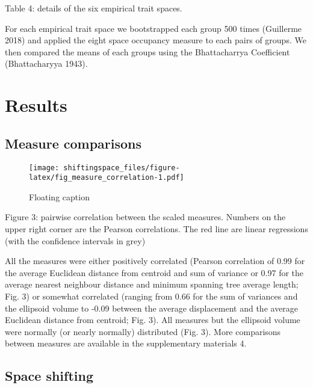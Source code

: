 \documentclass[]{article}
\begin{document}
Table 4: details of the six empirical trait spaces.

For each empirical trait space we bootstrapped each group 500 times
(Guillerme 2018) and applied the eight space occupancy measure to each
pairs of groups. We then compared the means of each groups using the
Bhattacharrya Coefficient (Bhattacharyya 1943).

\section{Results}\label{results}

\subsection{Measure comparisons}\label{measure-comparisons-1}

\begin{figure}
\centering
\texttt{[image: shiftingspace\_files/figure-latex/fig\_measure\_correlation-1.pdf]}
\caption{Floating caption}
\end{figure}
Figure 3: pairwise correlation between the scaled measures.
Numbers on the upper right corner are the Pearson correlations. The red
line are linear regressions (with the confidence intervals in grey)

All the measures were either positively correlated (Pearson correlation
of 0.99 for the average Euclidean distance from centroid and sum of
variance or 0.97 for the average nearest neighbour distance and minimum
spanning tree average length; Fig. 3) or somewhat correlated (ranging
from 0.66 for the sum of variances and the ellipsoid volume to -0.09
between the average displacement and the average Euclidean distance from
centroid; Fig. 3). All measures but the ellipsoid volume were normally
(or nearly normally) distributed (Fig. 3). More comparisons between
measures are available in the supplementary materials 4.

\subsection{Space shifting}\label{space-shifting}
\end{document}
